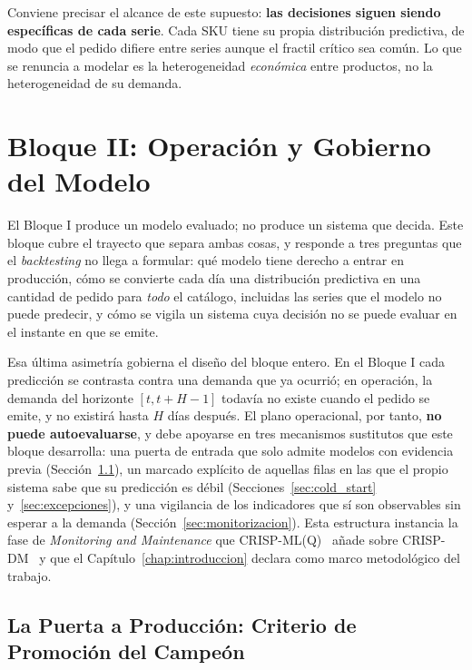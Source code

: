 Conviene precisar el alcance de este supuesto: \textbf{las decisiones siguen siendo específicas de cada serie}. Cada SKU tiene su propia distribución predictiva, de modo que el pedido difiere entre series aunque el fractil crítico sea común. Lo que se renuncia a modelar es la heterogeneidad \emph{económica} entre productos, no la heterogeneidad de su demanda.

\section{Bloque II: Operación y Gobierno del Modelo}
\label{sec:bloque_operacion}

El Bloque I produce un modelo evaluado; no produce un sistema que decida. Este bloque cubre el trayecto que separa ambas cosas, y responde a tres preguntas que el \textit{backtesting} no llega a formular: qué modelo tiene derecho a entrar en producción, cómo se convierte cada día una distribución predictiva en una cantidad de pedido para \emph{todo} el catálogo, incluidas las series que el modelo no puede predecir, y cómo se vigila un sistema cuya decisión no se puede evaluar en el instante en que se emite.

Esa última asimetría gobierna el diseño del bloque entero. En el Bloque I cada predicción se contrasta contra una demanda que ya ocurrió; en operación, la demanda del horizonte $[t, t+H-1]$ todavía no existe cuando el pedido se emite, y no existirá hasta $H$ días después. El plano operacional, por tanto, \textbf{no puede autoevaluarse}, y debe apoyarse en tres mecanismos sustitutos que este bloque desarrolla: una puerta de entrada que solo admite modelos con evidencia previa (Sección~\ref{sec:promocion}), un marcado explícito de aquellas filas en las que el propio sistema sabe que su predicción es débil (Secciones~\ref{sec:cold_start} y~\ref{sec:excepciones}), y una vigilancia de los indicadores que sí son observables sin esperar a la demanda (Sección~\ref{sec:monitorizacion}). Esta estructura instancia la fase de \textit{Monitoring and Maintenance} que CRISP-ML(Q)~\cite{studer2021crispmlq} añade sobre CRISP-DM~\cite{chapman2000crispdm} y que el Capítulo~\ref{chap:introduccion} declara como marco metodológico del trabajo.

\subsection{La Puerta a Producción: Criterio de Promoción del Campeón}
\label{sec:promocion}


